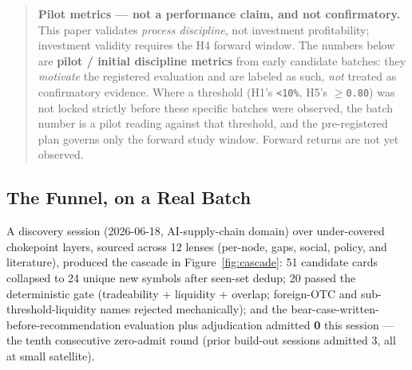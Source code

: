 \documentclass[11pt]{article}
\begin{document}
\begin{quote}
\textbf{Pilot metrics --- not a performance claim, and not confirmatory.}
This paper validates \emph{process discipline}, not investment profitability;
investment validity requires the H4 forward window. The numbers below are
\textbf{pilot / initial discipline metrics} from early candidate batches: they
\emph{motivate} the registered evaluation and are labeled as such, \emph{not}
treated as confirmatory evidence. Where a threshold (H1's \texttt{<10\%}, H5's
\texttt{$\geq$0.80}) was not locked strictly before these specific batches were
observed, the batch number is a pilot reading against that threshold, and the
pre-registered plan governs only the forward study window. Forward returns are
not yet observed.
\end{quote}

\subsection{The Funnel, on a Real Batch}

A discovery session (2026-06-18, AI-supply-chain domain) over under-covered
chokepoint layers, sourced across 12 lenses (per-node, gaps, social, policy, and
literature), produced the cascade in Figure~\ref{fig:cascade}: 51 candidate
cards collapsed to 24 unique new symbols after seen-set dedup; 20 passed the
deterministic gate (tradeability + liquidity + overlap; foreign-OTC and
sub-threshold-liquidity names rejected mechanically); and the
bear-case-written-before-recommendation evaluation plus adjudication admitted
\textbf{0} this session --- the tenth consecutive zero-admit round (prior
build-out sessions admitted 3, all at small satellite).
\end{document}
